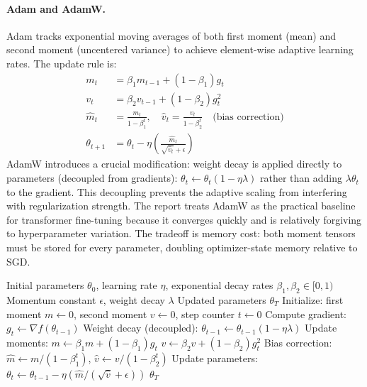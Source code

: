 \documentclass[11pt,a4paper]{article}
\begin{document}
\paragraph{Adam and AdamW.}
Adam tracks exponential moving averages of both first moment (mean) and second moment (uncentered variance) to achieve element-wise adaptive learning rates. The update rule is:
\begin{align}
m_t &= \beta_1 m_{t-1} + (1-\beta_1) g_t \\
v_t &= \beta_2 v_{t-1} + (1-\beta_2) g_t^2 \\
\hat{m}_t &= \frac{m_t}{1-\beta_1^t}, \quad \hat{v}_t = \frac{v_t}{1-\beta_2^t} \quad \text{(bias correction)} \\
\theta_{t+1} &= \theta_t - \eta \left(\frac{\hat{m}_t}{\sqrt{\hat{v}_t}+\epsilon}\right)
\end{align}
AdamW introduces a crucial modification: weight decay is applied directly to parameters (decoupled from gradients): $\theta_t \gets \theta_t(1-\eta\lambda)$ rather than adding $\lambda\theta_t$ to the gradient. This decoupling prevents the adaptive scaling from interfering with regularization strength. The report treats AdamW as the practical baseline for transformer fine-tuning because it converges quickly and is relatively forgiving to hyperparameter variation. The tradeoff is memory cost: both moment tensors must be stored for every parameter, doubling optimizer-state memory relative to SGD.

\begin{algorithm}[H]
\caption{AdamW (Adam with Decoupled Weight Decay)}
\label{alg:adamw}
\begin{algorithmic}[1]
\Require Initial parameters $\theta_0$, learning rate $\eta$, exponential decay rates $\beta_1, \beta_2 \in [0,1)$
\Require Momentum constant $\epsilon$, weight decay $\lambda$
\Ensure Updated parameters $\theta_T$
\State Initialize: first moment $m \gets 0$, second moment $v \gets 0$, step counter $t \gets 0$
    \State Compute gradient: $g_t \gets \nabla f(\theta_{t-1})$
    \State Weight decay (decoupled): $\theta_{t-1} \gets \theta_{t-1}(1 - \eta\lambda)$
    \State Update moments: $m \gets \beta_1 m + (1-\beta_1) g_t$
    \State $v \gets \beta_2 v + (1-\beta_2) g_t^2$
    \State Bias correction: $\hat{m} \gets m / (1 - \beta_1^t)$, $\hat{v} \gets v / (1 - \beta_2^t)$
    \State Update parameters: $\theta_t \gets \theta_{t-1} - \eta (\hat{m} / (\sqrt{\hat{v}} + \epsilon))$
\EndFor
\Return $\theta_T$
\end{algorithmic}
\end{algorithm}
\end{document}
